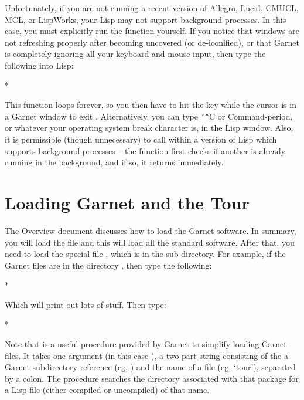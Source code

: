 Unfortunately, if you are not running a recent version of Allegro,
Lucid, CMUCL, MCL, or LispWorks, your Lisp may not support background
processes. In this case, you must explicitly run
the function yourself.  If you notice that windows are not refreshing
properly after becoming uncovered (or de-iconified), or that Garnet is
completely ignoring all your keyboard and mouse input, then type the
following into Lisp:
\begin{programexample}
* 
\end{programexample}
This function loops forever, so you then have to hit the
 key while the cursor is in a Garnet window to exit
.  Alternatively, you can type {\tt\char`\^}C or Command-period,
or whatever your operating system break character is,
in the Lisp window.  Also, it is permissible (though unnecessary) to call
 within a version of Lisp which supports background
processes -- the function first checks if another 
is already running in the background, and if so, it returns immediately.


\section{Loading Garnet and the Tour}

The Overview document discusses how to load the Garnet software.  In
summary, you will load the file  and this will load all
the standard software.  After that, you need to load the special file
, which is in the  sub-directory.
For example, if the Garnet files are in the directory
, then type the following:

\begin{programexample}
* 
\end{programexample}
Which will print out lots of stuff.  Then type:
\begin{programexample}
* 
\end{programexample}
Note that  is a useful procedure
provided by Garnet to simplify loading Garnet files.  It takes one
argument (in this case ), a two-part string consisting of
the a Garnet subdirectory reference (eg, ) and
the name of a file (eg, `tour'), separated by a colon.  The procedure
searches the directory associated with that package for a Lisp file (either
compiled or uncompiled) of that name.



